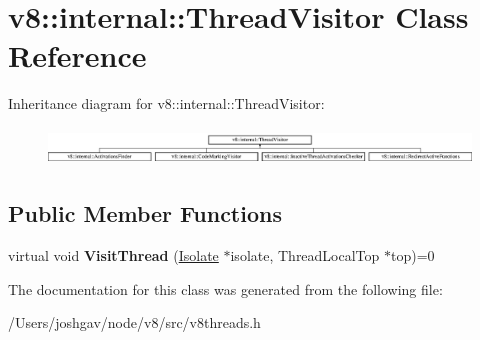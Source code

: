 \hypertarget{classv8_1_1internal_1_1_thread_visitor}{}\section{v8\+:\+:internal\+:\+:Thread\+Visitor Class Reference}
\label{classv8_1_1internal_1_1_thread_visitor}
Inheritance diagram for v8\+:\+:internal\+:\+:Thread\+Visitor\+:\begin{figure}[H]
\begin{center}
\leavevmode
\includegraphics[height=0.992908cm]{classv8_1_1internal_1_1_thread_visitor}
\end{center}
\end{figure}
\subsection*{Public Member Functions}
\begin{DoxyCompactItemize}
\item 
virtual void {\bfseries Visit\+Thread} (\hyperlink{classv8_1_1internal_1_1_isolate}{Isolate} $\ast$isolate, Thread\+Local\+Top $\ast$top)=0\hypertarget{classv8_1_1internal_1_1_thread_visitor_a1be34c6a86e87d00a507c5b7bf0652fe}{}\label{classv8_1_1internal_1_1_thread_visitor_a1be34c6a86e87d00a507c5b7bf0652fe}

\end{DoxyCompactItemize}


The documentation for this class was generated from the following file\+:\begin{DoxyCompactItemize}
\item 
/\+Users/joshgav/node/v8/src/v8threads.\+h\end{DoxyCompactItemize}

